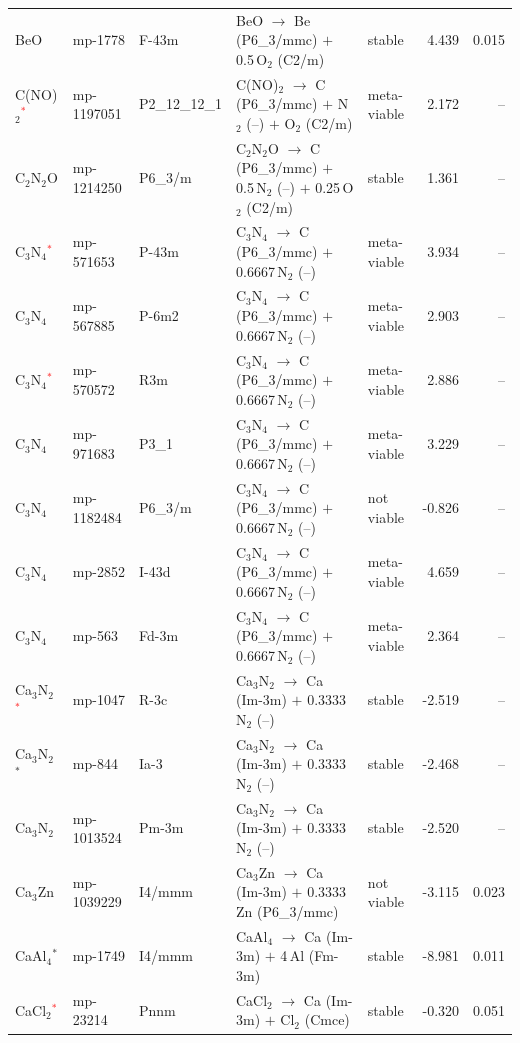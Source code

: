 \begin{longtable}{@{}ll l@{\hspace{4pt}} p{4.6cm} l@{\hspace{4pt}} rr@{}}
BeO & mp-1778 & F-43m & BeO $\to$ Be (P6\_3/mmc) $+$ 0.5\,O$_{2}$ (C2/m) & stable & 4.439 & 0.015 \\
C(NO)$_{2}$\textcolor{red}{$^*$} & mp-1197051 & P2\_12\_12\_1 & C(NO)$_{2}$ $\to$ C (P6\_3/mmc) $+$ N$_{2}$ (--) $+$ O$_{2}$ (C2/m) & meta-viable & 2.172 & -- \\
C$_{2}$N$_{2}$O & mp-1214250 & P6\_3/m & C$_{2}$N$_{2}$O $\to$ C (P6\_3/mmc) $+$ 0.5\,N$_{2}$ (--) $+$ 0.25\,O$_{2}$ (C2/m) & stable & 1.361 & -- \\
C$_{3}$N$_{4}$\textcolor{red}{$^*$} & mp-571653 & P-43m & C$_{3}$N$_{4}$ $\to$ C (P6\_3/mmc) $+$ 0.6667\,N$_{2}$ (--) & meta-viable & 3.934 & -- \\
C$_{3}$N$_{4}$ & mp-567885 & P-6m2 & C$_{3}$N$_{4}$ $\to$ C (P6\_3/mmc) $+$ 0.6667\,N$_{2}$ (--) & meta-viable & 2.903 & -- \\
C$_{3}$N$_{4}$\textcolor{red}{$^*$} & mp-570572 & R3m & C$_{3}$N$_{4}$ $\to$ C (P6\_3/mmc) $+$ 0.6667\,N$_{2}$ (--) & meta-viable & 2.886 & -- \\
C$_{3}$N$_{4}$ & mp-971683 & P3\_1 & C$_{3}$N$_{4}$ $\to$ C (P6\_3/mmc) $+$ 0.6667\,N$_{2}$ (--) & meta-viable & 3.229 & -- \\
C$_{3}$N$_{4}$ & mp-1182484 & P6\_3/m & C$_{3}$N$_{4}$ $\to$ C (P6\_3/mmc) $+$ 0.6667\,N$_{2}$ (--) & not viable & -0.826 & -- \\
C$_{3}$N$_{4}$ & mp-2852 & I-43d & C$_{3}$N$_{4}$ $\to$ C (P6\_3/mmc) $+$ 0.6667\,N$_{2}$ (--) & meta-viable & 4.659 & -- \\
C$_{3}$N$_{4}$ & mp-563 & Fd-3m & C$_{3}$N$_{4}$ $\to$ C (P6\_3/mmc) $+$ 0.6667\,N$_{2}$ (--) & meta-viable & 2.364 & -- \\
Ca$_{3}$N$_{2}$\textcolor{red}{$^*$} & mp-1047 & R-3c & Ca$_{3}$N$_{2}$ $\to$ Ca (Im-3m) $+$ 0.3333\,N$_{2}$ (--) & stable & -2.519 & -- \\
Ca$_{3}$N$_{2}$$^*$ & mp-844 & Ia-3 & Ca$_{3}$N$_{2}$ $\to$ Ca (Im-3m) $+$ 0.3333\,N$_{2}$ (--) & stable & -2.468 & -- \\
Ca$_{3}$N$_{2}$ & mp-1013524 & Pm-3m & Ca$_{3}$N$_{2}$ $\to$ Ca (Im-3m) $+$ 0.3333\,N$_{2}$ (--) & stable & -2.520 & -- \\
Ca$_{3}$Zn & mp-1039229 & I4/mmm & Ca$_{3}$Zn $\to$ Ca (Im-3m) $+$ 0.3333\,Zn (P6\_3/mmc) & not viable & -3.115 & 0.023 \\
CaAl$_{4}$$^*$ & mp-1749 & I4/mmm & CaAl$_{4}$ $\to$ Ca (Im-3m) $+$ 4\,Al (Fm-3m) & stable & -8.981 & 0.011 \\
CaCl$_{2}$\textcolor{red}{$^*$} & mp-23214 & Pnnm & CaCl$_{2}$ $\to$ Ca (Im-3m) $+$ Cl$_{2}$ (Cmce) & stable & -0.320 & 0.051 \\

\end{longtable}
